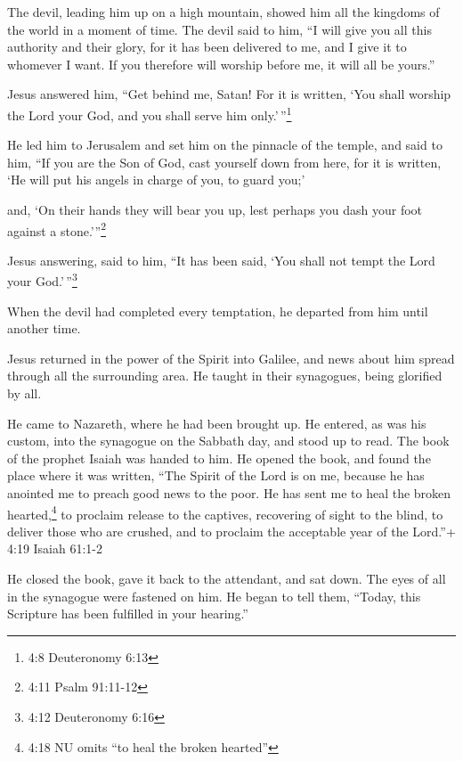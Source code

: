  The devil, leading him up on a high mountain, showed him
all the kingdoms of the world in a moment of time.  The
devil said to him, ``I will give you all this authority and their glory,
for it has been delivered to me, and I give it to whomever I want.
 If you therefore will worship before me, it will all be
yours.''

 Jesus answered him, ``Get behind me, Satan! For it is
written, `You shall worship the Lord your God, and you shall serve him
only.'\,''\footnote{4:8 Deuteronomy 6:13}

 He led him to Jerusalem and set him on the pinnacle of the
temple, and said to him, ``If you are the Son of God, cast yourself down
from here,  for it is written, `He will put his angels in
charge of you, to guard you;'

 and, `On their hands they will bear you up, lest perhaps
you dash your foot against a stone.'''\footnote{4:11 Psalm 91:11-12}

 Jesus answering, said to him, ``It has been said, `You
shall not tempt the Lord your God.'\,''\footnote{4:12 Deuteronomy 6:16}

 When the devil had completed every temptation, he departed
from him until another time.

 Jesus returned in the power of the Spirit into Galilee,
and news about him spread through all the surrounding area.
 He taught in their synagogues, being glorified by all.

 He came to Nazareth, where he had been brought up. He
entered, as was his custom, into the synagogue on the Sabbath day, and
stood up to read.  The book of the prophet Isaiah was
handed to him. He opened the book, and found the place where it was
written,  ``The Spirit of the Lord is on me, because he has
anointed me to preach good news to the poor. He has sent me to heal the
broken hearted,\footnote{4:18 NU omits ``to heal the broken hearted''}
to proclaim release to the captives, recovering of sight to the blind,
to deliver those who are crushed,  and to proclaim the
acceptable year of the Lord.''+ 4:19 Isaiah 61:1-2

 He closed the book, gave it back to the attendant, and sat
down. The eyes of all in the synagogue were fastened on him.
 He began to tell them, ``Today, this Scripture has been
fulfilled in your hearing.''

